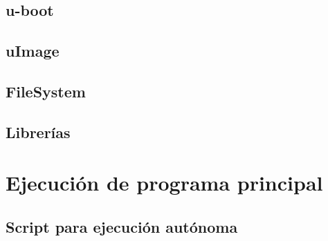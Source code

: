 \subsection{u-boot}
\subsection{uImage}
\subsection{FileSystem}
\subsection{Librerías}

\section{Ejecución de programa principal}
\subsection{Script para ejecución autónoma}
